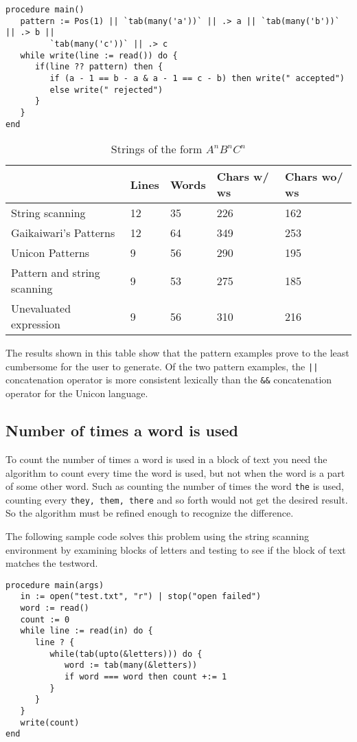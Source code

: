 \documentclass{article}
\begin{document}
\begin{verbatim}
procedure main()
   pattern := Pos(1) || `tab(many('a'))` || .> a || `tab(many('b'))` || .> b ||
         `tab(many('c'))` || .> c
   while write(line := read()) do {
      if(line ?? pattern) then {
         if (a - 1 == b - a & a - 1 == c - b) then write(" accepted")
         else write(" rejected")
      }
   }
end
\end{verbatim}

\begin{table}[ht]
	\caption{Strings of the form \emph{$A^nB^nC^n$}}
	\centering
	\begin{tabular}{|l|l|l|l|l|}
		\hline\hline
		 & Lines & Words & Chars w/ ws & Chars wo/ ws\\
		\hline
		String scanning & 12 & 35 & 226 & 162 \\
		Gaikaiwari's Patterns & 12 & 64 & 349 & 253 \\
		Unicon Patterns & 9 & 56 & 290 & 195 \\
		Pattern and string scanning & 9 & 53 & 275 & 185 \\
		Unevaluated expression & 9 & 56 & 310 & 216 \\
		\hline
	\end{tabular}
\end{table}
The results shown in this table show that the pattern examples prove to the least cumbersome for the user to generate.  Of the two pattern examples, the \texttt{||} concatenation operator is more consistent lexically than the \texttt{\&\&} concatenation operator for the Unicon language.

\subsection{Number of times a word is used}
To count the number of times a word is used in a block of text you need the algorithm to count every time the word is used, but not when the word is a part of some other word.  Such as counting the number of times the word \texttt{the} is used, counting every \texttt{they, them, there} and so forth would not get the desired result.  So the algorithm must be refined enough to recognize the difference.

The following sample code solves this problem using the string scanning environment by examining blocks of letters and testing to see if the block of text matches the testword.
\begin{verbatim}
procedure main(args)
   in := open("test.txt", "r") | stop("open failed")
   word := read()
   count := 0
   while line := read(in) do {
      line ? {
         while(tab(upto(&letters))) do {
            word := tab(many(&letters))
            if word === word then count +:= 1
         }
      }
   }
   write(count)
end
\end{verbatim}
\end{document}
